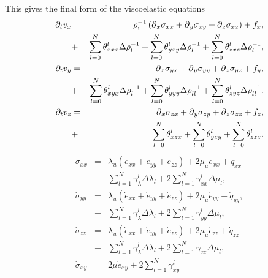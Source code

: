 \documentclass[11pt]{article}
\begin{document}
{This gives the final form of the viscoelastic equations
%
\begin{eqnarray}
  \partial_t{v}_x 
     & = & \rho^{-1}_i\left(\mbox{$\partial$}_x \sigma_{xx} +\mbox{$\partial$}_y 
           \sigma_{xy} +\mbox{$\partial$}_z \sigma_{xz}\right) + f_x,       \nonumber\\
     & + & \sum_{l=0}^N\theta^l_{xxx}\Delta\rho^{-1}_{l} 
           +  \sum_{l=0}^N\theta^l_{yxy}\Delta\rho^{-1}_{l} 
           +  \sum_{l=0}^N\theta^l_{zxz}\Delta\rho^{-1}_{l}, \nonumber\\ 
  \partial_t{v}_y 
     & = & \mbox{$\partial$}_x \sigma_{yx} +\mbox{$\partial$}_y \sigma_{yy} +\mbox{$\partial$}_z 
           \sigma_{yz} + f_y,                                \nonumber\\
     & + & \sum_{l=0}^N\theta^l_{xyx}\Delta\rho^{-1}_{l} 
           +  \sum_{l=0}^N\theta^l_{yyy}\Delta\rho^{-1}_{ll} 
           +  \sum_{l=0}^N\theta^l_{zyz}\Delta\rho^{-1}_{ll}.\nonumber\\ 
  \partial_t{v}_z 
    & = & \mbox{$\partial$}_x \sigma_{zx} +\mbox{$\partial$}_y \sigma_{zy} 
          +\mbox{$\partial$}_z \sigma_{zz} + f_z,                           \nonumber\\
    & + & \sum_{l=0}^N\theta^l_{xzx} +  \sum_{l=0}^N\theta^l_{yzy} +  
          \sum_{l=0}^N\theta^l_{zzz}.                        \nonumber\\
\end{eqnarray}
\begin{eqnarray}
  \dot{\sigma}_{xx} 
    & = & \lambda_u \left (\dot{e}_{xx} + \dot{e}_{yy} + \dot{e}_{zz}\right)
         + 2\mu_u \dot{e}_{xx} +\dot{q}_{xx}                 \nonumber\\
    & + & \sum_{l=1}^N\gamma^l_{\lambda}\Delta\lambda_l  
         + 2\sum_{l=1}^N\gamma^l_{xx}\Delta\mu_l,            \nonumber\\
  \dot{\sigma}_{yy} 
    & = & \lambda_u 
         \left (\dot{e}_{xx} + \dot{e}_{yy} + \dot{e}_{zz}\right)
         + 2\mu_u \dot{e}_{yy} +\dot{q}_{yy},                     \nonumber\\
    & + & \sum_{l=1}^N\gamma^l_{\lambda}\Delta\lambda_l  
         + 2\sum_{l=1}^N\gamma^l_{yy}\Delta\mu_l,                 \nonumber\\
  \dot{\sigma}_{zz} 
    & = & \lambda_u \left (\dot{e}_{xx} + \dot{e}_{yy} 
         + \dot{e}_{zz}\right)+ 2\mu_u \dot{e}_{zz} +\dot{q}_{zz} \nonumber\\
    & + & \sum_{l=1}^N\gamma^l_{\lambda}\Delta\lambda_l  
         + 2\sum_{l=1}^N\gamma_{zz}\Delta\mu_l,                   \nonumber\\
  \dot{\sigma}_{xy} 
    & = & 2\mu \dot{e}_{xy} + 2\sum_{l=1}^N\gamma^l_{xy}

\end{eqnarray}}
\end{document}
